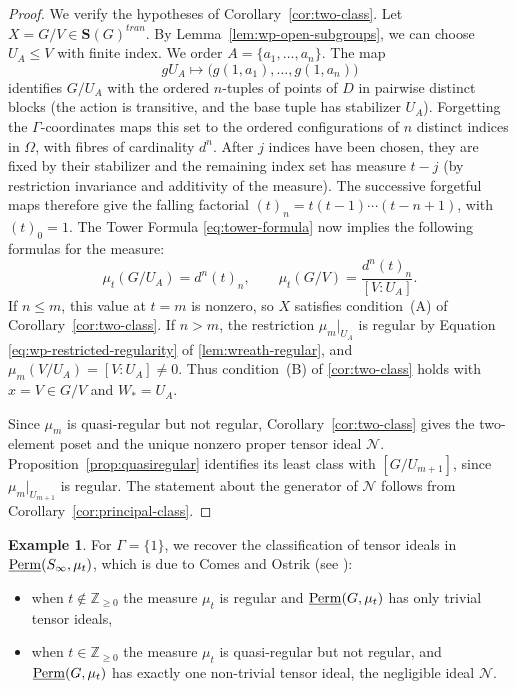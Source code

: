 \documentclass[11pt,a4paper]{amsart}
\theoremstyle{plain}%
\theoremstyle{definition}
\newtheorem{example}[lemma]{Example}
\theoremstyle{remark}
\newcommand{\Z}{{\mathbb Z}}
\newcommand{\Perm}{\underline{{\rm Perm}}}
\newcommand{\Set}[1]{\mathbf{S}(#1)}
\begin{document}
\begin{proof}
We verify the hypotheses of Corollary~\ref{cor:two-class}. Let $X=G/V \in \Set{G}^{tran}$. By
Lemma~\ref{lem:wp-open-subgroups}, we can choose $U_A\leq V$ with finite
index. We order $A=\{a_1,\ldots,a_n\}$. The map
\[
  gU_A\longmapsto\bigl(g(1,a_1),\ldots,g(1,a_n)\bigr)
\]
identifies $G/U_A$ with the ordered $n$-tuples of points of $D$
in pairwise distinct blocks (the action is transitive, and the
base tuple has stabilizer $U_A$).
Forgetting the $\Gamma$-coordinates maps this set to the ordered
configurations of $n$ distinct indices in $\Omega$, with fibres
of cardinality $d^n$. After $j$ indices have been chosen, they
are fixed by their stabilizer and the remaining index set has
measure $t-j$ (by restriction invariance and additivity of the measure). The successive forgetful maps therefore give the falling
factorial $(t)_n=t(t-1)\cdots(t-n+1)$, with $(t)_0=1$.
The Tower Formula \eqref{eq:tower-formula} now implies the following formulas for the measure:
\[
  \mu_t(G/U_A)=d^n(t)_n,
  \qquad
  \mu_t(G/V)=\frac{d^n(t)_n}{[V:U_A]}.
\]
If $n\leq m$, this value at $t=m$ is nonzero, so $X$ satisfies
condition~\textup{(A)} of Corollary~\ref{cor:two-class}.
If $n>m$, the restriction $\mu_m|_{U_A}$ is regular by Equation
\eqref{eq:wp-restricted-regularity} of \cref{lem:wreath-regular}, and
$\mu_m(V/U_A)=[V:U_A]\ne0$. Thus condition~\textup{(B)} of \cref{cor:two-class}
holds with $x=V\in G/V$ and $W_*=U_A$.

Since $\mu_m$ is quasi-regular but not regular,
Corollary~\ref{cor:two-class} gives the two-element poset and the
unique nonzero proper tensor ideal $\mathcal N$.
Proposition~\ref{prop:quasiregular} identifies its least class
with $[G/U_{m+1}]$, since $\mu_m|_{U_{m+1}}$ is regular.
The statement about the generator of $\mathcal{N}$ follows from Corollary~\ref{cor:principal-class}.
\end{proof}

\begin{example}\label{ex:ideals_symmetric}
    For $\Gamma=\{1\}$, we recover the classification of tensor ideals in $\Perm(S_{\infty}, \mu_t)$, which is due to Comes and Ostrik (see \cite[Theorem 3.15]{CO-abelian}):
    \begin{itemize}
        \item when $t\notin \Z_{\geq 0}$ the measure $\mu_t$ is regular and $\Perm(G, \mu_t)$ has only trivial tensor ideals,
        \item when $t\in \Z_{\geq 0}$ the measure $\mu_t$ is quasi-regular but not regular, and $\Perm(G, \mu_t)$ has exactly one non-trivial tensor ideal, the negligible ideal $\mathcal{N}$.
    \end{itemize}
\end{example}
\end{document}
